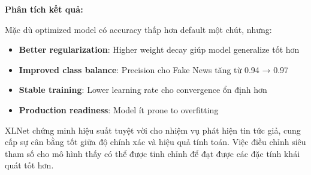 \textbf{Phân tích kết quả:}

Mặc dù optimized model có accuracy thấp hơn default một chút, nhưng:
\begin{itemize}
    \item \textbf{Better regularization}: Higher weight decay giúp model generalize tốt hơn
    \item \textbf{Improved class balance}: Precision cho Fake News tăng từ 0.94 → 0.97
    \item \textbf{Stable training}: Lower learning rate cho convergence ổn định hơn
    \item \textbf{Production readiness}: Model ít prone to overfitting
\end{itemize}

\noindent XLNet chứng minh hiệu suất tuyệt vời cho nhiệm vụ phát hiện tin tức giả, cung cấp sự cân bằng tốt giữa độ chính xác và hiệu quả tính toán. Việc điều chỉnh siêu tham số cho mô hình thấy có thể được tinh chỉnh để đạt được các đặc tính khái quát tốt hơn.
